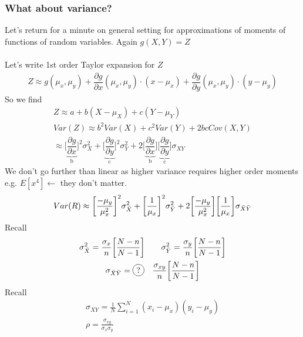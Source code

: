 \subsubsection*{What about variance?}
Let's return for a minute on general setting for approximations of moments of functions of random variables. Again $g(X,Y) = Z$\\\\
Let's write 1st order Taylor expansion for $Z$
\begin{gather*}
	Z \approx g(\mu_x, \mu_y) + \dfrac{\partial g}{\partial x}(\mu_x, \mu_y) \cdot (x - \mu_x) + \dfrac{\partial g}{\partial y}(\mu_x, \mu_y) \cdot (y - \mu_y)
\end{gather*}
So we find 
\begin{gather*}
	Z \approx a + b(X - \mu_X) + c(Y - \mu_Y)\\
	Var(Z) \approx b^2Var(X) + c^2 Var(Y) + 2bcCov(X,Y)\\
	\approx \bigg[\underbrace{\dfrac{\partial g}{\partial x}}_{\text{b}} \bigg]^2 \sigma_X^2 + \bigg[\underbrace{\dfrac{\partial g}{\partial y}}_{\text{c}} \bigg]^2 \sigma_Y^2 + 2 \bigg[\underbrace{\dfrac{\partial g}{\partial x}}_{\text{b}} \bigg] \bigg[\underbrace{\dfrac{\partial g}{\partial y}}_{\text{c}} \bigg] \sigma_{XY}
\end{gather*}
We don't go further than linear as higher variance requires higher order moments e.g. $E[x^4] \leftarrow$ they don't matter.
\begin{gather*}
	Var(R) \approx \bigg[\dfrac{-\mu_y}{\mu_x^2} \bigg]^2 \sigma_{\bar{X}}^2 + \bigg[ \frac{1}{\mu_x} \bigg]^2 \sigma_{\bar{Y}}^2 + 2 \bigg[\dfrac{-\mu_y}{\mu_x^2} \bigg] \bigg[\frac{1}{\mu_x} \bigg] \sigma_{\bar{X} \bar{Y}}
\end{gather*}
Recall
\begin{gather*}
	\sigma_{\bX}^2 = \frac{\sigma_x}{n} \bigg[\frac{N-n}{N-1} \bigg] \qquad \sigma_{\bar{Y}}^2 = \frac{\sigma_y}{n} \bigg[\frac{N-n}{N-1} \bigg]\\
	\sigma_{\bX \bar{Y}} = \circled{?} \quad \frac{\sigma_{xy}}{n} \bigg[\frac{N-n}{N-1} \bigg]
\end{gather*}
Recall
\begin{gather*}
	\sigma_{XY} = \frac{1}{N} \sum_{i=1}^N (x_i - \mu_x)(y_i - \mu_y)\\
	\rho = \frac{\sigma_{xy}}{\sigma_x \sigma_y}
\end{gather*}